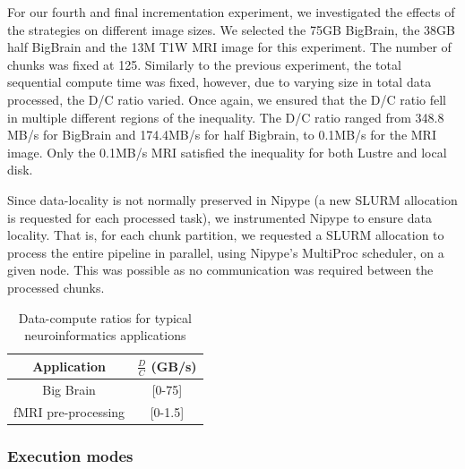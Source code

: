 \documentclass{IEEEtran}
\begin{document}
For our fourth and final incrementation experiment, we investigated the effects 
of the strategies on different image sizes. We selected the 75GB BigBrain, the
38GB half BigBrain and the 13M T1W MRI image for this experiment. The number of
chunks was fixed at 125. Similarly to the previous experiment, the total 
sequential compute time was fixed, however, due to varying size in total data 
processed, the D/C ratio varied. Once again, we ensured that the D/C ratio fell
in multiple different regions of the inequality. The D/C ratio ranged from 
348.8 MB/s for BigBrain and 174.4MB/s for half Bigbrain, to 0.1MB/s for the MRI 
image. Only the 0.1MB/s MRI satisfied the inequality for both Lustre and local 
disk.

Since data-locality is not normally preserved in Nipype (a new SLURM allocation 
is requested for each processed task), we instrumented Nipype to ensure data 
locality. That is, for each chunk partition, we requested a SLURM allocation to
process the entire pipeline in parallel, using Nipype's MultiProc scheduler, on 
a given node. This was possible as no communication was required between the 
processed chunks.









\begin{table}
\centering
\begin{tabular}{c|c}
Application & $\frac{D}{C}$ (GB/s)\\
\hline
Big Brain            & [0-75] \\
fMRI pre-processing  & [0-1.5]
\end{tabular}
\label{table:applications}
\caption{Data-compute ratios for typical neuroinformatics applications}
\end{table}

\subsubsection{Execution modes} %
\end{document}
